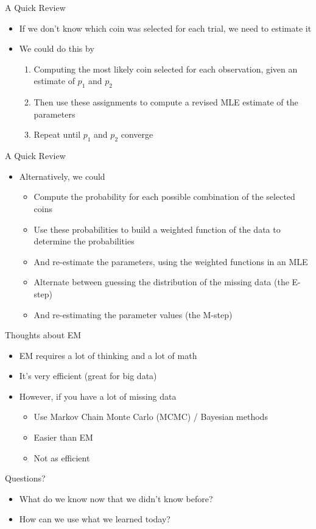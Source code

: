 \documentclass[aspectratio=169]{beamer}
\begin{document}
\begin{frame}[fragile]{A Quick Review}
        \begin{itemize}
	\item If we don't know which coin was selected for each trial, we need to estimate it
	\item We could do this by
	        \begin{enumerate}
		\item Computing the most likely coin selected for each observation, given an estimate of $p_1$ and $p_2$
		\item Then use these assignments to compute a revised MLE estimate of the parameters
		\item Repeat until $p_1$ and $p_2$ converge
		\end{enumerate}
	\end{itemize}
\end{frame}
\begin{frame}[fragile]{A Quick Review}
        \begin{itemize}
	\item Alternatively, we could 
	        \begin{itemize}
		\item Compute the probability for each possible combination of the selected coins
		\item Use these probabilities to build a weighted function of the data to determine the probabilities
		\item And re-estimate the parameters, using the weighted functions in an MLE
		\vspace{1 em}
		\item Alternate between guessing the distribution of the missing data (the E-step)
		\item And re-estimating the parameter values (the M-step)
		\end{itemize}
	\end{itemize}
\end{frame}
\begin{frame}{Thoughts about EM}
\begin{itemize}
\item EM requires a lot of thinking and a lot of math
\item It's very efficient (great for big data)
\item However, if you have a lot of missing data
\begin{itemize}
\item Use Markov Chain Monte Carlo (MCMC) / Bayesian methods 
\item Easier than EM
\item Not as efficient
\end{itemize}
\end{itemize}
\end{frame}
\begin{frame}{Questions?}
\begin{itemize}
	\item What do we know now that we didn't know before?

	\item How can we use what we learned today?
\end{itemize}
\end{frame}
\end{document}
